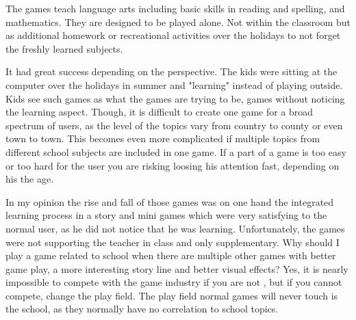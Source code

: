 The games teach language arts including basic skills in reading and spelling, and mathematics.
They are designed to be played alone. Not within the classroom but as additional homework or
recreational activities over the holidays to not forget the freshly learned subjects.

It had great success depending on the perspective. The kids were sitting at the computer over the holidays in summer
and "learning" instead of playing outside. Kids see such games as what the games are trying to be, games without noticing
the learning aspect. Though, it is difficult to create one game for a broad spectrum of users, as the level of the topics
vary from country to county or even town to town. This becomes even more complicated if multiple topics from different
school subjects are included in one game. If a part of a game is too easy or too hard for the user you are risking
loosing his attention fast, depending on his the age.

In my opinion the rise and fall of those games was on one hand the integrated learning process in a story and mini games which
were very satisfying to the normal user, as he did not notice that he was learning.
Unfortunately, the games were not supporting the teacher in class and only supplementary.
Why should I play a game related to school when there are multiple other games with better game play,
a more interesting story line and better visual effects?
Yes, it is nearly impossible to compete with the game industry if you are not , but if you cannot compete, change the play field.
The play field normal games will never touch is the school, as they normally have no correlation to school topics.
